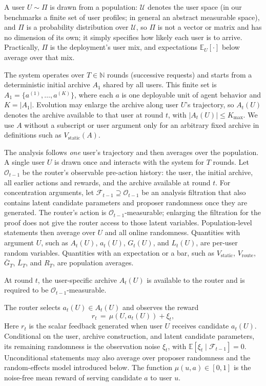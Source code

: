 \documentclass{article} %
\providecommand{\E}{\mathbb{E}}
\begin{document}
A user $U \sim \Pi$ is drawn from a population: $\mathcal{U}$ denotes the user space (in our benchmarks a finite set of user profiles; in general an abstract measurable space), and $\Pi$ is a probability distribution over $\mathcal{U}$, so $\Pi$ is not a vector or matrix and has no dimension of its own; it simply specifies how likely each user is to arrive. Practically, $\Pi$ is the deployment's user mix, and expectations $\E_U[\cdot]$ below average over that mix.

The system operates over $T \in \mathbb{N}$ rounds (successive requests) and starts from a deterministic initial archive $A_1$ shared by all users. This finite set is $A_1 = \{a^{(1)}, \dots, a^{(K)}\}$, where each $a$ is one deployable unit of agent behavior and $K = |A_1|$. Evolution may enlarge the archive along user $U$'s trajectory, so $A_t(U)$ denotes the archive available to that user at round $t$, with $|A_t(U)| \leq K_{\max}$. We use $A$ without a subscript or user argument only for an arbitrary fixed archive in definitions such as $V_{\mathrm{static}}(A)$.

The analysis follows \emph{one} user's trajectory and then averages over the population. A single user \(U\) is drawn once and interacts with the system for \(T\) rounds. Let \(\mathcal O_{t-1}\) be the router's observable pre-action history: the user, the initial archive, all earlier actions and rewards, and the archive available at round \(t\). For concentration arguments, let \(\mathcal F_{t-1}\supseteq\mathcal O_{t-1}\) be an analysis filtration that also contains latent candidate parameters and proposer randomness once they are generated. The router's action is \(\mathcal O_{t-1}\)-measurable; enlarging the filtration for the proof does not give the router access to those latent variables. Population-level statements then average over \(U\) and all online randomness. Quantities with argument \(U\), such as \(A_t(U)\), \(a_t(U)\), \(G_t(U)\), and \(L_t(U)\), are per-user random variables.  Quantities with an expectation or a bar, such as \(V_{\mathrm{static}}\), \(V_{\mathrm{route}}\), \(\bar G_T\), \(\bar L_T\), and \(R_T\), are population averages.

At round $t$, the user-specific archive $A_t(U)$ is available to the router and is required to be $\mathcal{O}_{t-1}$-measurable.

The router selects $a_t(U) \in A_t(U)$ and observes the reward
\begin{equation}
r_t \,=\, \mu(U, a_t(U)) + \xi_t ,
\end{equation}
Here \(r_t\) is the scalar feedback generated when user \(U\) receives candidate \(a_t(U)\). Conditional on the user, archive construction, and latent candidate parameters, its remaining randomness is the observation noise \(\xi_t\), with \(\E[\xi_t\mid\mathcal F_{t-1}]=0\). Unconditional statements may also average over proposer randomness and the random-effects model introduced below. The function \(\mu(u,a)\in[0,1]\) is the noise-free mean reward of serving candidate \(a\) to user \(u\).
\end{document}
